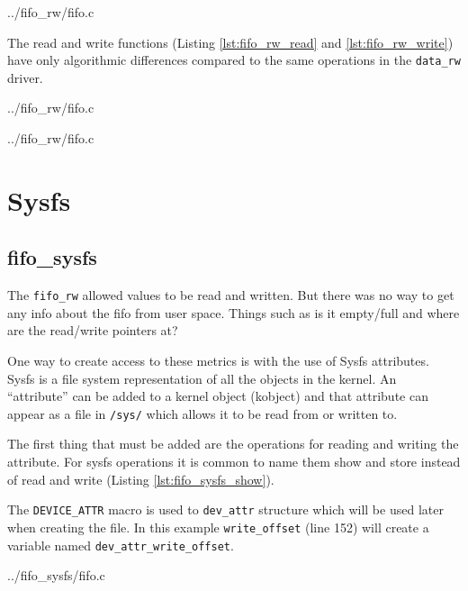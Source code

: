\documentclass{article}
\begin{document}

	{../fifo_rw/fifo.c}

The read and write functions
(Listing \ref{lst:fifo_rw_read} and \ref{lst:fifo_rw_write})
have only algorithmic differences compared to the same operations in the
\verb+data_rw+ driver.


	{../fifo_rw/fifo.c}


	{../fifo_rw/fifo.c}

\section{Sysfs}


\clearpage
\subsection{fifo\_sysfs}

The \verb+fifo_rw+ allowed values to be read and written.
But there was no way to get any info about the fifo from user space.
Things such as is it empty/full and where are the read/write pointers
at?

One way to create access to these metrics is with the use of Sysfs attributes.
Sysfs is a file system representation of all the objects in the kernel.
An ``attribute'' can be added to a kernel object (kobject) and
that attribute can appear as a file in \verb+/sys/+ which allows it
to be read from or written to.

The first thing that must be added are the operations for reading
and writing the attribute.
For sysfs operations it is common to name them show and store instead
of read and write (Listing \ref{lst:fifo_sysfs_show}).

The \verb+DEVICE_ATTR+ macro is used to \verb+dev_attr+ structure which
will be used later when creating the file.
In this example \verb+write_offset+ (line 152) will create a variable named
\verb+dev_attr_write_offset+.


	{../fifo_sysfs/fifo.c}
\end{document}
